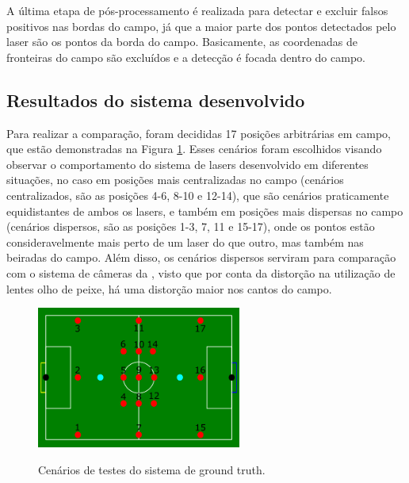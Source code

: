 \documentclass[acronym, symbols, table, deposito]{fei}
\begin{document}
				A última etapa de pós-processamento é realizada para detectar e excluir falsos positivos nas bordas do campo, já que a maior parte dos pontos detectados pelo laser são os pontos da borda do campo. Basicamente, as coordenadas de fronteiras do campo são excluídos e a detecção é focada dentro do campo.
		
			\subsection{Resultados do sistema desenvolvido}
		
				Para realizar a comparação, foram decididas 17 posições arbitrárias em campo, que estão demonstradas na Figura \ref{fig:cenarios_testes_ground_truth}. Esses cenários foram escolhidos visando observar o comportamento do sistema de lasers desenvolvido em diferentes situações, no caso em posições mais centralizadas no campo (cenários centralizados, são as posições 4-6, 8-10 e 12-14), que são cenários praticamente equidistantes de ambos os lasers, e também em posições mais dispersas no campo (cenários dispersos, são as posições 1-3, 7, 11 e 15-17), onde os pontos estão consideravelmente mais perto de um laser do que outro, mas também nas beiradas do campo. Além disso, os cenários dispersos serviram para comparação com o sistema de câmeras da , visto que por conta da distorção na utilização de lentes olho de peixe, há uma distorção maior nos cantos do campo.
				
				\begin{figure}[!htb]
					\centering
					\caption{Cenários de testes do sistema de ground truth.}
					\includegraphics[width=0.6\textwidth]{cenarios_testes.png}
					\label{fig:cenarios_testes_ground_truth}
				\end{figure}
			
\end{document}
